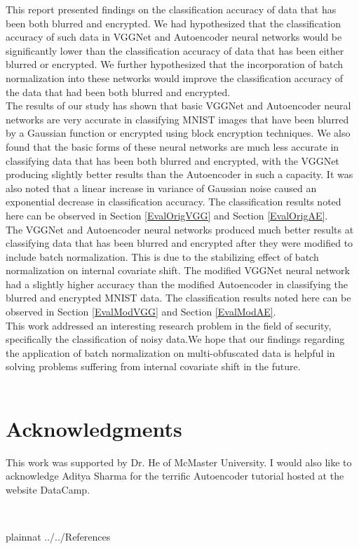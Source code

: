 \documentclass[12pt, titlepage]{article}
\begin{document}
\noindent This report presented findings on the classification accuracy of data that has been both blurred and encrypted. We had hypothesized that the classification accuracy of such data in VGGNet and Autoencoder neural networks would be significantly lower than the classification accuracy of data that has been either blurred or encrypted. We further hypothesized that the incorporation of batch normalization into these networks would improve the classification accuracy of the data that had been both blurred and encrypted.\\

\noindent The results of our study has shown that basic VGGNet and Autoencoder neural networks are very accurate in classifying MNIST images that have been blurred by a Gaussian function or encrypted using block encryption techniques. We also found that the basic forms of these neural networks are much less accurate in classifying data that has been both blurred and encrypted, with the VGGNet producing slightly better results than the Autoencoder in such a capacity. It was also noted that a linear increase in variance of Gaussian noise caused an exponential decrease in classification accuracy. The classification results noted here can be observed in Section \ref{EvalOrigVGG} and Section \ref{EvalOrigAE}.\\

\noindent The VGGNet and Autoencoder neural networks produced much better results at classifying data that has been blurred and encrypted after they were modified to include batch normalization. This is due to the stabilizing effect of batch normalization on internal covariate shift. The modified VGGNet neural network had a slightly higher accuracy than the modified Autoencoder in classifying the blurred and encrypted MNIST data. The classification results noted here can be observed in Section \ref{EvalModVGG} and Section \ref{EvalModAE}.\\

\noindent This work addressed an interesting research problem in the field of security, specifically the classification of noisy data.We hope that our findings regarding the application of batch normalization on multi-obfuscated data is helpful in solving problems suffering from internal covariate shift in the future.\\

~\newpage
\section{Acknowledgments}

This work was supported by Dr. He of McMaster University. I would also like to acknowledge Aditya Sharma for the terrific Autoencoder tutorial hosted at the website DataCamp.  


~\newpage

 {plainnat}
 {../../References}
\end{document}
